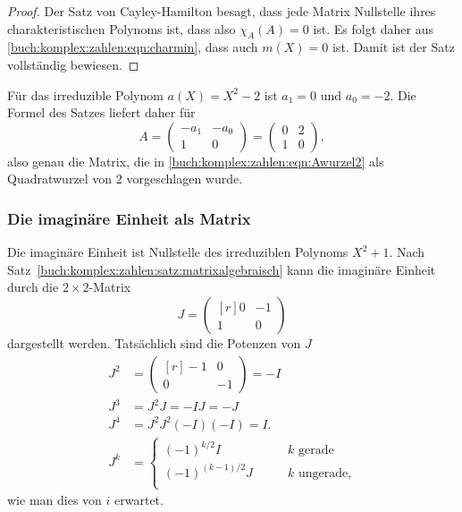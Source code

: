 \begin{proof}
Der Satz von Cayley-Hamilton \cite[Satz 13.23]{buch:linalg} besagt, dass 
%
%
jede Matrix Nullstelle ihres charakteristischen Polynoms ist, dass also
$\chi_A(A)=0$ ist.
Es folgt daher aus \eqref{buch:komplex:zahlen:eqn:charmin},
dass auch $m(X)=0$ ist.
Damit ist der Satz vollständig bewiesen.
\end{proof}

\begin{beispiel}
Für das irreduzible Polynom $a(X) = X^2-2$ ist
$a_1=0$ und $a_0=-2$.
Die Formel des Satzes liefert daher für 
\[
A
=
\begin{pmatrix}
-a_1&-a_0\\
  1 &  0
\end{pmatrix}
=
\begin{pmatrix}
0 & 2 \\
1 & 0
\end{pmatrix},
\]
also genau die Matrix, die in
\eqref{buch:komplex:zahlen:eqn:Awurzel2}
als Quadratwurzel von $2$ vorgeschlagen wurde.
\end{beispiel}

%
%
\subsubsection{Die imaginäre Einheit als Matrix}
Die imaginäre Einheit ist Nullstelle des irreduziblen Polynoms
$X^2+1$.
Nach Satz~\ref{buch:komplex:zahlen:satz:matrixalgebraisch} kann
die imaginäre Einheit durch die $2\times 2$-Matrix
\[
J
=
\begin{pmatrix*}[r]
0 & -1 \\
1 &  0
\end{pmatrix*}
\]
dargestellt werden.
Tatsächlich sind die Potenzen von $J$
\begin{align*}
J^2
&=
\begin{pmatrix*}[r]
-1& 0\\
 0&-1
\end{pmatrix*}
=
-I
\\
J^3
&=
J^2J
=
-IJ
=
-J
\\
J^4
&=
J^2J^2
(-I)(-I)
=
I.
\\
J^k
&=
\begin{cases}
(-1)^{k/2}I&\qquad \text{$k$ gerade} \\
(-1)^{(k-1)/2}J&\qquad \text{$k$ ungerade,} \\
\end{cases}
\end{align*}
wie man dies von $i$ erwartet.

